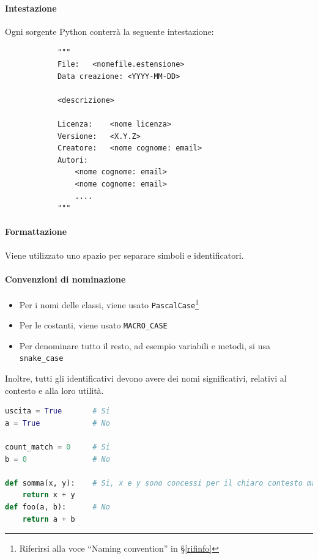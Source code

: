         \paragraph{Intestazione} %
		Ogni sorgente Python conterrà la seguente intestazione:
		\begin{verbatim}
			"""
			File:	<nomefile.estensione>
			Data creazione: <YYYY-MM-DD>

			<descrizione>

			Licenza:	<nome licenza>
			Versione:	<X.Y.Z>
			Creatore:	<nome cognome: email>
			Autori:
				<nome cognome: email>
				<nome cognome: email>
				....
			"""
		\end{verbatim}

		\paragraph{Formattazione}
		Viene utilizzato uno spazio per separare simboli e identificatori.
		


		\paragraph{Convenzioni di nominazione}
		\begin{itemize}
			\item Per i nomi delle classi, viene usato \texttt{PascalCase}\footnote{Riferirsi alla voce ``Naming convention'' in \S\ref{rifinfo}}
			\item Per le costanti, viene usato \texttt{MACRO\_CASE}
			\item Per denominare tutto il resto, ad esempio variabili e metodi, si usa \texttt{snake\_case}
		\end{itemize}

		Inoltre, tutti gli identificativi devono avere dei nomi significativi, relativi al contesto e alla loro utilità.
\begin{lstlisting}[language=Python]
uscita = True		# Si
a = True			# No

count_match = 0		# Si
b = 0				# No

def somma(x, y):	# Si, x e y sono concessi per il chiaro contesto matematico
	return x + y
def foo(a, b):		# No
	return a + b
\end{lstlisting}



